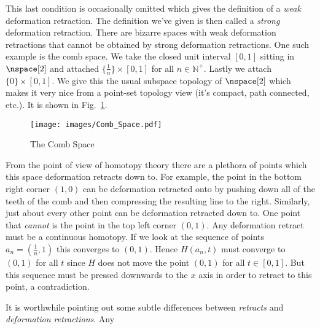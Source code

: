 \documentclass[oneside]{book}                                                  %
\begin{document}
                This last condition is occasionally omitted which gives the
                definition of a \textit{weak} deformation retraction. The
                definition we've given is then called a \textit{strong}
                deformation retraction. There are bizarre spaces with weak
                deformation retractions that cannot be obtained by strong
                deformation retractions. One such example is the comb space.
                We take the closed unit interval $[0,1]$ sitting in $\nspace[2]$
                and attached $\{\frac{1}{n}\}\times[0,1]$ for all
                $n\in\mathbb{N}^{+}$. Lastly we attach $\{0\}\times[0,1]$. We
                give this the usual subspace topology of $\nspace[2]$ which
                makes it very nice from a point-set topology view (it's compact,
                path connected, etc.). It is shown in Fig.~\ref{fig:Comb_Space}.
                \begin{figure}[H]
                    \centering
                    \captionsetup{type=figure}
                    \texttt{[image: images/Comb\_Space.pdf]}
                    \caption{The Comb Space}
                    \label{fig:Comb_Space}
                \end{figure}
                From the point of view of homotopy theory there are a plethora
                of points which this space deformation retracts down to. For
                example, the point in the bottom right corner $(1,0)$ can be
                deformation retracted onto by pushing down all of the teeth of
                the comb and then compressing the resulting line to the right.
                Similarly, just about every other point can be deformation
                retracted down to. One point that \textit{cannot} is the point
                in the top left corner $(0,1)$. Any deformation retract must
                be a continuous homotopy. If we look at the sequence of points
                $a_{n}=(\frac{1}{n},1)$ this converges to $(0,1)$. Hence
                $H(a_{n},t)$ must converge to $(0,1)$ for all $t$ since $H$ does
                not move the point $(0,1)$ for all $t\in[0,1]$. But this
                sequence must be pressed downwards to the $x$ axis in order to
                retract to this point, a contradiction.
                \par\hfill\par
                It is worthwhile pointing out some subtle differences between
                \textit{retracts} and \textit{deformation retractions}. Any
\end{document}
